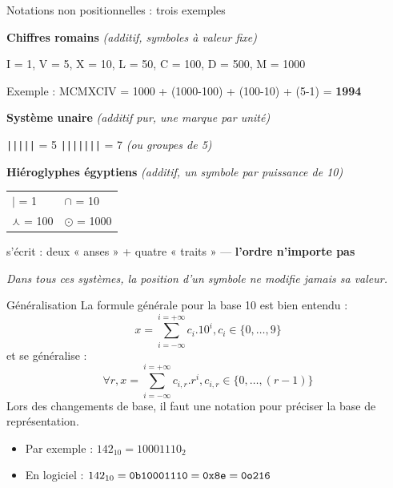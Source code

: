 \begin{frame}{Notations non positionnelles : trois exemples}

\textbf{Chiffres romains} \hfill \textit{(additif, symboles à valeur fixe)}

\smallskip
I = 1, V = 5, X = 10, L = 50, C = 100, D = 500, M = 1000

\smallskip
Exemple : MCMXCIV = 1000 + (1000-100) + (100-10) + (5-1) = \textbf{1994}

\vspace{0.6cm}

\textbf{Système unaire} \hfill \textit{(additif pur, une marque par unité)}

\smallskip
\texttt{|||||} = 5 \qquad \texttt{|||||||} = 7 \quad \textit{(ou groupes de 5)}

\vspace{0.6cm}

\textbf{Hiéroglyphes égyptiens} \hfill \textit{(additif, un symbole par puissance de 10)}

\smallskip
\begin{tabular}{ll}
$\vert$ = 1 & $\cap$ = 10 \\
$\curlywedge$ = 100 & $\odot$ = 1000 \\
\end{tabular}

 s'écrit : deux « anses » + quatre « traits » --- \textbf{l'ordre n'importe pas}

\vspace{0.4cm}

\centering
\footnotesize\itshape
Dans tous ces systèmes, la position d'un symbole ne modifie jamais sa valeur.

\end{frame}

\begin{frame}{Généralisation}
  La formule générale pour la base 10 est bien entendu :
  $$ x = \sum_{i=-\infty}^{i=+\infty} c_i.10^i, c_i \in \{0,\dots,9 \}$$
  et se généralise :
  $$ \forall r, x = \sum_{i=-\infty}^{i=+\infty} c_{i,r}.r^i, c_{i,r} \in \{0,\dots,(r-1)\}$$
  Lors des changements de base, il faut une notation pour préciser la base de représentation.
  \begin{itemize}
    \item Par exemple : $ 142_{10} = 10001110_{2}$
    \item En logiciel : $ 142_{10} = \text{\texttt{0b10001110}} = \text{\texttt{0x8e}} = \text{\texttt{0o216}}$

    \end{itemize}
\end{frame}

